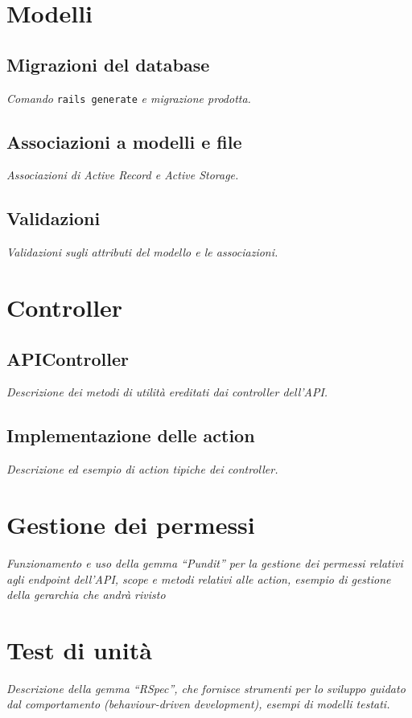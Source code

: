 \section{Modelli}
\subsection{Migrazioni del database}
\emph{Comando} \texttt{rails generate} \emph{e migrazione prodotta.}

\subsection{Associazioni a modelli e file}
\emph{Associazioni di Active Record e Active Storage.}

\subsection{Validazioni}
\emph{Validazioni sugli attributi del modello e le associazioni.}

\section{Controller}
\subsection{APIController}
\emph{Descrizione dei metodi di utilità ereditati dai controller dell'API.}

\subsection{Implementazione delle action}
\emph{Descrizione ed esempio di action tipiche dei controller.}

\section{Gestione dei permessi}
\emph{Funzionamento e uso della gemma ``Pundit'' per la gestione dei permessi relativi agli endpoint dell'API, scope e metodi relativi alle action, esempio di gestione della gerarchia che andrà rivisto}

\section{Test di unità}
\emph{Descrizione della gemma ``RSpec'', che fornisce strumenti per lo sviluppo guidato dal comportamento (behaviour-driven development), esempi di modelli testati.}

